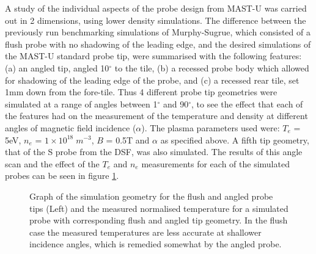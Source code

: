 \documentclass[a4paper, 12pt]{article} %
\begin{document}
	A study of the individual aspects of the probe design from MAST-U was carried out in 2 dimensions, using lower density simulations. 
	The difference between the previously run benchmarking simulations of Murphy-Sugrue, which consisted of a flush probe with no shadowing of the leading edge, and the desired simulations of the MAST-U standard probe tip, were summarised with the following features: (a) an angled tip, angled 10$^{\circ}$ to the tile, (b) a recessed probe body which allowed for shadowing of the leading edge of the probe, and (c) a recessed rear tile, set 1mm down from the fore-tile.  
	Thus 4 different probe tip geometries were simulated at a range of angles between 1$^{\circ}$ and 90$^{\circ}$, to see the effect that each of the features had on the measurement of the temperature and density at different angles of magnetic field incidence ($\alpha$).
	The plasma parameters used were: $T_e$ = 5eV, $n_e$ = $1 \times 10^{18} \; m^{-3}$, $B$ = 0.5T and $\alpha$ as specified above. 
	A fifth tip geometry, that of the S probe from the DSF, was also simulated. 
	The results of this angle scan and the effect of the $T_e$ and $n_e$ measurements for each of the simulated probes can be seen in figure \ref{fig:sim-incidence-angle}.
	\begin{figure}[!tb]
		\vspace{-0pt}
		\caption{
			Graph of the simulation geometry for the flush and angled probe tips (Left) and the measured normalised temperature for a simulated probe with corresponding flush and angled tip geometry. 
			In the flush case the measured temperatures are less accurate at shallower incidence angles, which is remedied somewhat by the angled probe.
			}
		\label{fig:sim-incidence-angle}
		\vspace{-15pt}
	\end{figure}
	
\end{document}
